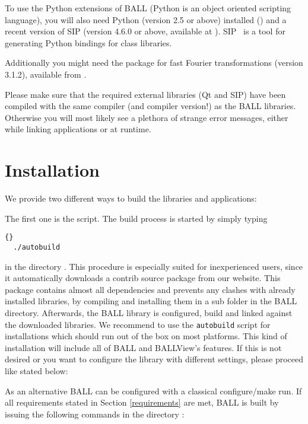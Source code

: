 To use the Python extensions of BALL (Python is an object oriented scripting
language),  you will also need Python (version 2.5 or above) 
installed () and a recent version of SIP (version 
4.6.0 or above, available at ).
SIP~\cite{SIP}  is a tool for generating Python bindings for \CPP 
class libraries.

Additionally you might need the  \cite{FFTW} package for fast 
Fourier transformations (version 3.1.2), available from 
.

Please make sure that the required external \CPP libraries (\ie Qt and SIP)
have been compiled with the same compiler (and compiler version!) as the BALL
libraries. Otherwise you will most likely see a plethora of strange error
messages, either while linking applications or at runtime.


\section{Installation}
\label{section:building-ball}

We provide two different ways to build the libraries and applications:

The first one is the  script. The build process is started by 
simply typing

\begin{lstlisting}{}
  ./autobuild
\end{lstlisting}

\noindent in the directory .  
This procedure is especially suited for inexperienced users, since it 
automatically downloads a contrib source package from our website. This 
package contains almost all dependencies and prevents any clashes with already 
installed libraries, by compiling and installing them in a sub folder in the 
BALL directory. Afterwards, the BALL library is configured, build and linked 
against the downloaded libraries. We recommend to use the {\tt autobuild} 
script for installations which should run out of the box on most platforms. 
This kind of installation will include all of
BALL and \mbox{BALLView's} features. If this is not desired or you want to 
configure the library with different settings, please proceed like stated below:

As an alternative BALL can be configured with a classical configure/make
run. If all requirements stated in Section \ref{requirements} are met, BALL is
built by issuing the following commands in the directory 
:

